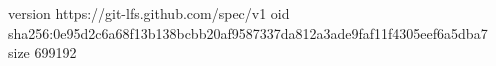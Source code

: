 version https://git-lfs.github.com/spec/v1
oid sha256:0e95d2c6a68f13b138bcbb20af9587337da812a3ade9faf11f4305eef6a5dba7
size 699192
